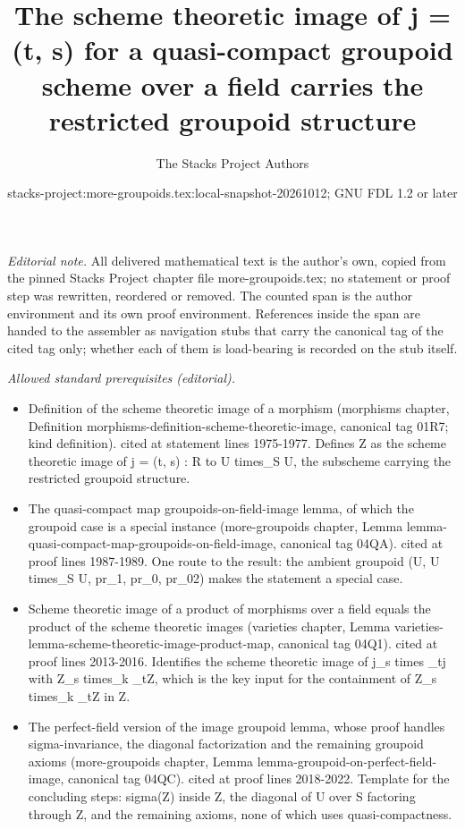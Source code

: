 \documentclass{stacks-project}
\title{The scheme theoretic image of j = (t, s) for a quasi-compact groupoid scheme over a field carries the restricted groupoid structure}
\author{The Stacks Project Authors}
\date{stacks-project:more-groupoids.tex:local-snapshot-20261012; GNU FDL 1.2 or later}
\theoremstyle{plain}
\theoremstyle{definition}
\theoremstyle{remark}
\numberwithin{equation}{subsection}
\begin{document}
\maketitle
\setcounter{subsection}{1}
\noindent\textit{Editorial note.} All delivered mathematical text is the author's own, copied from the pinned Stacks Project chapter file more-groupoids.tex; no statement or proof step was rewritten, reordered or removed. The counted span is the author environment and its own proof environment. References inside the span are handed to the assembler as navigation stubs that carry the canonical tag of the cited tag only; whether each of them is load-bearing is recorded on the stub itself.\par\medskip
\noindent\textit{Allowed standard prerequisites (editorial).}\begin{itemize}
\item Definition of the scheme theoretic image of a morphism (morphisms chapter, Definition morphisms-definition-scheme-theoretic-image, canonical tag 01R7; kind definition). cited at statement lines 1975-1977. Defines Z as the scheme theoretic image of j = (t, s) : R to U times\_S U, the subscheme carrying the restricted groupoid structure.
\item The quasi-compact map groupoids-on-field-image lemma, of which the groupoid case is a special instance (more-groupoids chapter, Lemma lemma-quasi-compact-map-groupoids-on-field-image, canonical tag 04QA). cited at proof lines 1987-1989. One route to the result: the ambient groupoid (U, U times\_S U, pr\_1, pr\_0, pr\_02) makes the statement a special case.
\item Scheme theoretic image of a product of morphisms over a field equals the product of the scheme theoretic images (varieties chapter, Lemma varieties-lemma-scheme-theoretic-image-product-map, canonical tag 04Q1). cited at proof lines 2013-2016. Identifies the scheme theoretic image of j\_s times \_tj with Z\_s times\_k \_tZ, which is the key input for the containment of Z\_s times\_k \_tZ in Z.
\item The perfect-field version of the image groupoid lemma, whose proof handles sigma-invariance, the diagonal factorization and the remaining groupoid axioms (more-groupoids chapter, Lemma lemma-groupoid-on-perfect-field-image, canonical tag 04QC). cited at proof lines 2018-2022. Template for the concluding steps: sigma(Z) inside Z, the diagonal of U over S factoring through Z, and the remaining axioms, none of which uses quasi-compactness.
\end{itemize}\medskip
\end{document}
